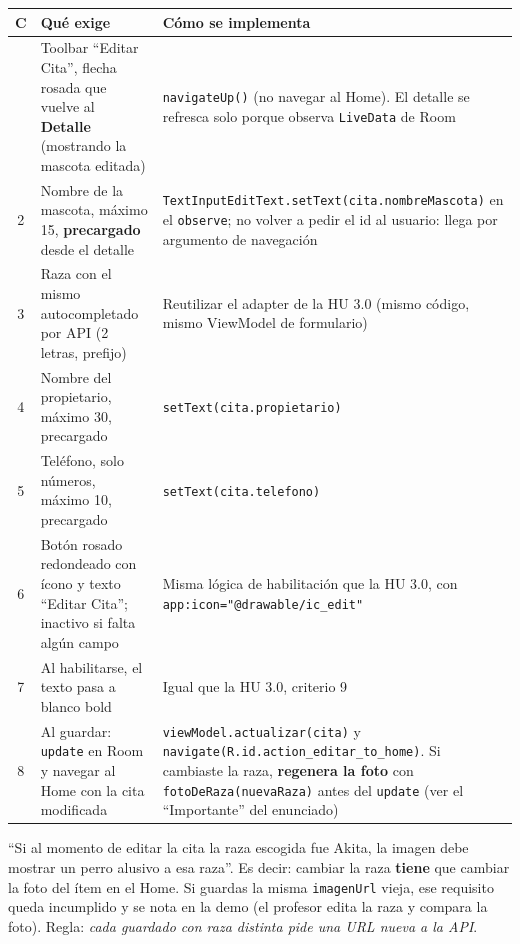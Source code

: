 \documentclass[11pt,letterpaper]{article}
\newcommand{\code}[1]{\texttt{\small #1}}
\begin{document}
\begin{center}
\footnotesize
\begin{xltabular}{\linewidth}{@{}c X X@{}}
\toprule
\textbf{C} & \textbf{Qu\'e exige} & \textbf{C\'omo se implementa}\\
\midrule
\endhead
\bottomrule
{} & Toolbar ``Editar Cita'', flecha rosada que vuelve al \textbf{Detalle} (mostrando la mascota editada) & \code{navigateUp(\allowbreak{})} (no navegar al Home). El detalle se refresca solo porque observa \code{LiveData} de Room\\
2 & Nombre de la mascota, m\'aximo 15, \textbf{precargado} desde el detalle & \code{TextInputEditText.\allowbreak{}setText(\allowbreak{}cita.nombreMascota)} en el \code{observe}; no volver a pedir el id al usuario: llega por argumento de navegaci\'on\\
3 & Raza con el mismo autocompletado por API (2 letras, prefijo) & Reutilizar el adapter de la HU 3.0 (mismo c\'odigo, mismo ViewModel de formulario)\\
4 & Nombre del propietario, m\'aximo 30, precargado & \code{setText(\allowbreak{}cita.propietario)}\\
5 & Tel\'efono, solo n\'umeros, m\'aximo 10, precargado & \code{setText(\allowbreak{}cita.telefono)}\\
6 & Bot\'on rosado redondeado con \'icono y texto ``Editar Cita''; inactivo si falta alg\'un campo & Misma l\'ogica de habilitaci\'on que la HU 3.0, con \code{app:icon="@drawable/\allowbreak{}ic\_edit"}\\
7 & Al habilitarse, el texto pasa a blanco bold & Igual que la HU 3.0, criterio 9\\
8 & Al guardar: \code{update} en Room y navegar al Home con la cita modificada & \code{viewModel.\allowbreak{}actualizar(\allowbreak{}cita)} y \code{navigate(\allowbreak{}R.id.action\_editar\_to\_home)}. Si cambiaste la raza, \textbf{regenera la foto} con \code{fotoDeRaza(\allowbreak{}nuevaRaza)} antes del \code{update} (ver el ``Importante'' del enunciado)\\
\end{xltabular}
\end{center}

\begin{notabox}
``Si al momento de editar la cita la raza escogida fue Akita, la imagen debe
mostrar un perro alusivo a esa raza''. Es decir: cambiar la raza \textbf{tiene}
que cambiar la foto del \'item en el Home. Si guardas la misma \code{imagenUrl}
vieja, ese requisito queda incumplido y se nota en la demo (el profesor edita la
raza y compara la foto). Regla: \emph{cada guardado con raza distinta pide una
URL nueva a la API}.
\end{notabox}
\end{document}
